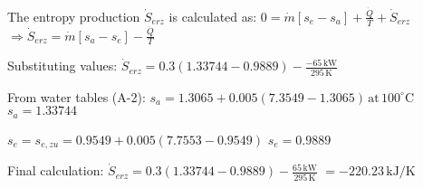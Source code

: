 The entropy production \( \dot{S}_{erz} \) is calculated as:  
\( 0 = \dot{m} [s_e - s_a] + \frac{\dot{Q}}{T} + \dot{S}_{erz} \)  
\( \Rightarrow \dot{S}_{erz} = \dot{m} [s_a - s_e] - \frac{\dot{Q}}{T} \)  

Substituting values:  
\( \dot{S}_{erz} = 0.3 (1.33744 - 0.9889) - \frac{-65 \, \text{kW}}{295 \, \text{K}} \)  

From water tables (A-2):  
\( s_a = 1.3065 + 0.005 (7.3549 - 1.3065) \, \text{at} \, 100^\circ \text{C} \)  
\( s_a = 1.33744 \)  

\( s_e = s_{e, zu} = 0.9549 + 0.005 (7.7553 - 0.9549) \)  
\( s_e = 0.9889 \)  

Final calculation:  
\( \dot{S}_{erz} = 0.3 (1.33744 - 0.9889) - \frac{65 \, \text{kW}}{295 \, \text{K}} \)  
\( = -220.23 \, \text{kJ/K} \)